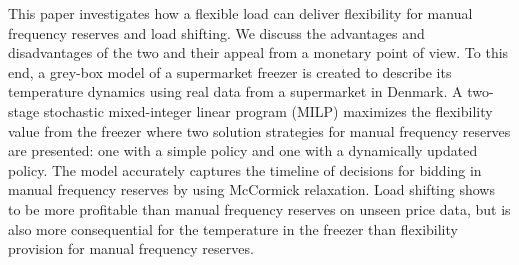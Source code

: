 
This paper investigates how a flexible load can deliver flexibility for manual frequency reserves and load shifting. We discuss the advantages and disadvantages of the two and their appeal from a monetary point of view. To this end, a grey-box model of a supermarket freezer is created to describe its temperature dynamics using real data from a supermarket in Denmark. A two-stage stochastic mixed-integer linear program (MILP) maximizes the flexibility value from the freezer where two solution strategies for manual frequency reserves are presented: one with a simple policy and one with a dynamically updated policy. The model accurately captures the timeline of decisions for bidding in manual frequency reserves by using McCormick relaxation. Load shifting shows to be more profitable than manual frequency reserves on unseen price data, but is also more consequential for the temperature in the freezer than flexibility provision for manual frequency reserves.
